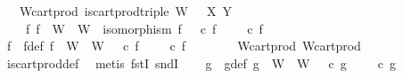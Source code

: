 \begin{isabellebody}
\ \ \ W{\isacharprime}{\kern0pt}{\isacharunderscore}{\kern0pt}cart{\isacharunderscore}{\kern0pt}prod{\isacharcolon}{\kern0pt}\ {\isachardoublequoteopen}is{\isacharunderscore}{\kern0pt}cart{\isacharunderscore}{\kern0pt}prod{\isacharunderscore}{\kern0pt}triple\ {\isacharparenleft}{\kern0pt}W{\isacharprime}{\kern0pt}{\isacharcomma}{\kern0pt}\ {\isasympi}{\isacharprime}{\kern0pt}\ {\isasympi}{\isacharprime}{\kern0pt}\ X\ Y{\isachardoublequoteclose}\isanewline
\ \ \ {\isachardoublequoteopen}{\isasymexists}\ f{\isachardot}{\kern0pt}\ f\ {\isacharcolon}{\kern0pt}\ W\ {\isasymrightarrow}\ W{\isacharprime}{\kern0pt}\ {\isasymand}\ isomorphism\ f\ {\isasymand}\ {\isasympi}{\isacharprime}{\kern0pt}\ {\isasymcirc}\isactrlsub c\ f\ {\isacharequal}{\kern0pt}\ {\isasympi}\ {\isasymand}\ {\isasympi}{\isacharprime}{\kern0pt}\ {\isasymcirc}\isactrlsub c\ f\ {\isacharequal}{\kern0pt}\ {\isasympi}\isanewline
%
\isadelimproof
%
\endisadelimproof
%
\isatagproof
{}\isamarkupfalse%
\ {\isacharminus}{\kern0pt}\isanewline
\ \ \isamarkupfalse%
\ f\ \ f{\isacharunderscore}{\kern0pt}def{\isacharcolon}{\kern0pt}\ {\isachardoublequoteopen}f\ {\isacharcolon}{\kern0pt}\ W\ {\isasymrightarrow}\ W{\isacharprime}{\kern0pt}\ {\isasymand}\ {\isasympi}{\isacharprime}{\kern0pt}\ {\isasymcirc}\isactrlsub c\ f\ {\isacharequal}{\kern0pt}\ {\isasympi}\ {\isasymand}\ {\isasympi}{\isacharprime}{\kern0pt}\ {\isasymcirc}\isactrlsub c\ f\ {\isacharequal}{\kern0pt}\ {\isasympi}\isanewline
\ \ \ \ \isamarkupfalse%
\ W{\isacharprime}{\kern0pt}{\isacharunderscore}{\kern0pt}cart{\isacharunderscore}{\kern0pt}prod\ W{\isacharunderscore}{\kern0pt}cart{\isacharunderscore}{\kern0pt}prod\ \isamarkupfalse%
\ is{\isacharunderscore}{\kern0pt}cart{\isacharunderscore}{\kern0pt}prod{\isacharunderscore}{\kern0pt}def\ \isamarkupfalse%
\ {\isacharparenleft}{\kern0pt}metis\ fstI\ sndI{\isacharparenright}{\kern0pt}\isanewline
\isanewline
\ \ \isamarkupfalse%
\ g\ \ g{\isacharunderscore}{\kern0pt}def{\isacharcolon}{\kern0pt}\ {\isachardoublequoteopen}g\ {\isacharcolon}{\kern0pt}\ W{\isacharprime}{\kern0pt}\ {\isasymrightarrow}\ W\ {\isasymand}\ {\isasympi}\ {\isasymcirc}\isactrlsub c\ g\ {\isacharequal}{\kern0pt}\ {\isasympi}{\isacharprime}{\kern0pt}\ {\isasymand}\ {\isasympi}\ {\isasymcirc}\isactrlsub c\ g\ {\isacharequal}{\kern0pt}\ {\isasympi}{\isacharprime}{\kern0pt}\isanewline

\end{isabellebody}
